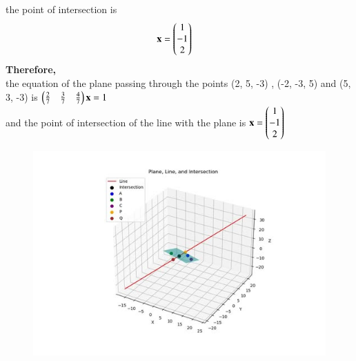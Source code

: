 \documentclass[journal]{IEEEtran}
\begin{document}
the point of intersection is
\begin{align}
\mathbf{x}&=\begin{pmatrix}1\\-1\\2\end{pmatrix}
\end{align}
\textbf{Therefore,}\\
the equation of the plane passing through the points (2, 5, -3) , (-2, -3, 5) and
(5, 3, -3) is $\begin{pmatrix}\tfrac{2}{7}&\tfrac{3}{7} &\tfrac{4}{7}\end{pmatrix}\mathbf{x}=1$\\
and the point of intersection of the line with the plane is $\mathbf{x}=\begin{pmatrix}1\\-1\\2\end{pmatrix}$

\begin{figure}[H]
    \centering
    \includegraphics[scale=0.7]{figs/4.4.12.jpg}
    \caption{}
    \label{fig:1}
\end{figure}
\end{document}
